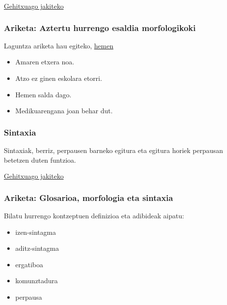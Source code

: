 \documentclass[
]{book}
\providecommand{\tightlist}{%
  \setlength{\itemsep}{0pt}\setlength{\parskip}{0pt}}
\begin{document}
\href{https://www.hiru.eus/eu/lengua-vasca/sintagmas-de-la-oracion-declinacion}{Gehitxuago jakiteko}

\hypertarget{ariketa-aztertu-hurrengo-esaldia-morfologikoki}{%
\subsubsection*{Ariketa: Aztertu hurrengo esaldia morfologikoki}\label{ariketa-aztertu-hurrengo-esaldia-morfologikoki}}

Laguntza ariketa hau egiteko, \href{http://ixa2.si.ehu.es/demo/analisianali.jsp}{hemen}

\begin{itemize}
\tightlist
\item
  Amaren etxera noa.
\item
  Atzo ez ginen eskolara etorri.
\item
  Hemen salda dago.
\item
  Medikuarengana joan behar dut.
\end{itemize}

\hypertarget{sintaxia}{%
\subsubsection{Sintaxia}\label{sintaxia}}

Sintaxiak, berriz, perpausen barneko egitura eta egitura horiek
perpausan betetzen duten funtzioa.

\href{https://www.ehu.eus/seg/hizk/1/4}{Gehitxuago jakiteko}

\hypertarget{T2A2}{%
\subsubsection*{Ariketa: Glosarioa, morfologia eta sintaxia}\label{T2A2}}

Bilatu hurrengo kontzeptuen definizioa eta adibideak aipatu:

\begin{itemize}
\tightlist
\item
  izen-sintagma
\item
  aditz-sintagma
\item
  ergatiboa
\item
  komunztadura
\item
  perpausa
\end{itemize}
\end{document}

